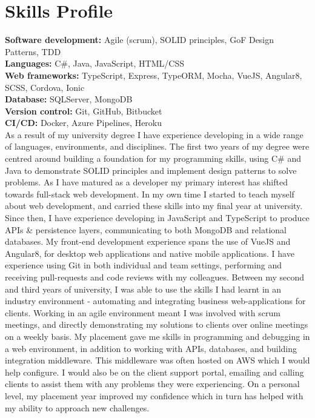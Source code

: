\documentclass[11pt]{article}
\begin{document}
\section*{Skills Profile}
\vspace*{-5pt}
{\bf Software development: } Agile (scrum), SOLID principles, GoF Design Patterns, TDD\\
{\bf Languages: } C\#, Java, JavaScript, HTML/CSS\\
{\bf Web frameworks: } TypeScript, Express, TypeORM, Mocha, VueJS, Angular8, SCSS, Cordova, Ionic\\
{\bf Database: } SQLServer, MongoDB\\
{\bf Version control: } Git, GitHub, Bitbucket\\
{\bf CI/CD: } Docker, Azure Pipelines, Heroku\\[5pt]
As a result of my university degree I have experience developing in a wide range of languages, environments, and disciplines. The first two years of my degree were centred around building a foundation for my programming skills, using C\# and Java to demonstrate SOLID principles and implement design patterns to solve problems. As I have matured as a developer my primary interest has shifted towards full-stack web development. In my own time I started to teach myself about web development, and carried these skills into my final year at university. Since then, I have experience developing in JavaScript and TypeScript to produce APIs \& persistence layers, communicating to both MongoDB and relational databases. My front-end development experience spans the use of VueJS and Angular8, for desktop web applications and native mobile applications. I have experience using Git in both individual and team settings, performing and receiving pull-requests and code reviews with my colleagues.
\newline\newline
Between my second and third years of university, I was able to use the skills I had learnt in an industry environment - automating and integrating business web-applications for clients. Working in an agile environment meant I was involved with scrum meetings, and directly demonstrating my solutions to clients over online meetings on a weekly basis. My placement gave me skills in programming and debugging in a web environment, in addition to working with APIs, databases, and building integration middleware. This middleware was often hosted on AWS which I would help configure. I would also be on the client support portal, emailing and calling clients to assist them with any problems they were experiencing. On a personal level, my placement year improved my confidence which in turn has helped with my ability to approach new challenges.
\end{document}

